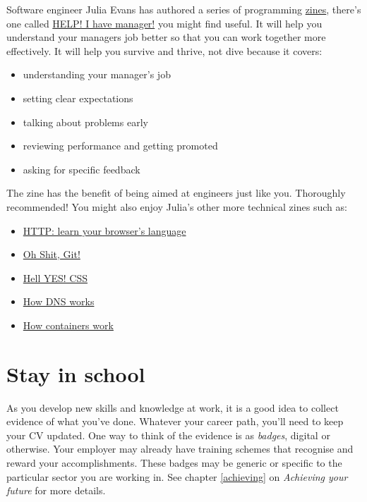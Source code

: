\documentclass[
]{book}
\providecommand{\tightlist}{%
  \setlength{\itemsep}{0pt}\setlength{\parskip}{0pt}}
\begin{document}
Software engineer Julia Evans has authored a series of programming \href{https://en.wikipedia.org/wiki/Zine}{zines}, there's one called \href{https://wizardzines.com/zines/manager/}{HELP! I have manager!} \citep{helpihaveamanager} you might find useful. It will help you understand your managers job better so that you can work together more effectively. It will help you survive and thrive, not dive because it covers:

\begin{itemize}
\tightlist
\item
  understanding your manager's job
\item
  setting clear expectations
\item
  talking about problems early
\item
  reviewing performance and getting promoted
\item
  asking for specific feedback
\end{itemize}

The zine has the benefit of being aimed at engineers just like you. Thoroughly recommended! You might also enjoy Julia's other more technical zines such as:

\begin{itemize}
\tightlist
\item
  \href{https://wizardzines.com/zines/http/}{HTTP: learn your browser's language} \citep{browserslanguage}
\item
  \href{https://wizardzines.com/zines/oh-shit-git/}{Oh Shit, Git!} \citep{ohshitgit}
\item
  \href{https://wizardzines.com/zines/css/}{Hell YES! CSS} \citep{hellyescss}
\item
  \href{https://wizardzines.com/zines/dns/}{How DNS works} \citep{howdnsworks}
\item
  \href{https://wizardzines.com/zines/containers/}{How containers work} \citep{howcontainerswork}
\end{itemize}

\hypertarget{neverstoplearning}{%
\section{Stay in school}\label{neverstoplearning}}

As you develop new skills and knowledge at work, it is a good idea to collect evidence of what you've done. Whatever your career path, you'll need to keep your CV updated. One way to think of the evidence is as \emph{badges}, digital or otherwise. Your employer may already have training schemes that recognise and reward your accomplishments. These badges may be generic or specific to the particular sector you are working in. See chapter \ref{achieving} on \emph{Achieving your future} for more details.
\end{document}
